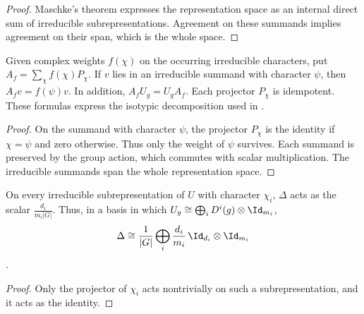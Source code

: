 \begin{proof}\leanok
    Maschke's theorem expresses the representation space as an internal
    direct sum of irreducible subrepresentations. Agreement on these
    summands implies agreement on their span, which is the whole space.
\end{proof}

\begin{lemma}
    \label{thm:peps_weighted_character_projectors}
    \leanok
    Given complex weights $f(\chi)$ on the occurring irreducible characters,
    put $A_f=\sum_\chi f(\chi)P_\chi$. If $v$ lies in an irreducible summand
    with character $\psi$, then $A_fv=f(\psi)v$. In addition,
    $A_fU_g=U_gA_f$. Each projector $P_\chi$ is idempotent. These formulas
    express the isotypic decomposition used in
    \cite[Lemma~4.4]{Schuch2010PEPS}.
\end{lemma}

\begin{proof}\leanok
    On the summand with character $\psi$, the projector $P_\chi$ is the
    identity if $\chi=\psi$ and zero otherwise. Thus only the weight of
    $\psi$ survives. Each summand is preserved by the group action,
    which commutes with scalar multiplication. The irreducible summands
    span the whole representation space.
\end{proof}

\begin{lemma}%
    \label{thm:peps_delta_block_form}
    \leanok
    On every irreducible subrepresentation of $U$ with character $\chi_i$,
    $\Delta$ acts as the scalar $\frac{d_i}{m_i|G|}$. Thus, in a basis in which
    $U_g\cong\bigoplus_iD^i(g)\otimes\Id_{m_i}$,
    \begin{align*}
        \Delta\cong\frac{1}{|G|}\bigoplus_i\frac{d_i}{m_i}\,
        \Id_{d_i}\otimes\Id_{m_i}
    \end{align*}
    \cite[Lemma~4.4]{Schuch2010PEPS}.
\end{lemma}

\begin{proof}\leanok
    Only the projector of $\chi_i$ acts nontrivially on such a
    subrepresentation, and it acts as the identity.
\end{proof}


